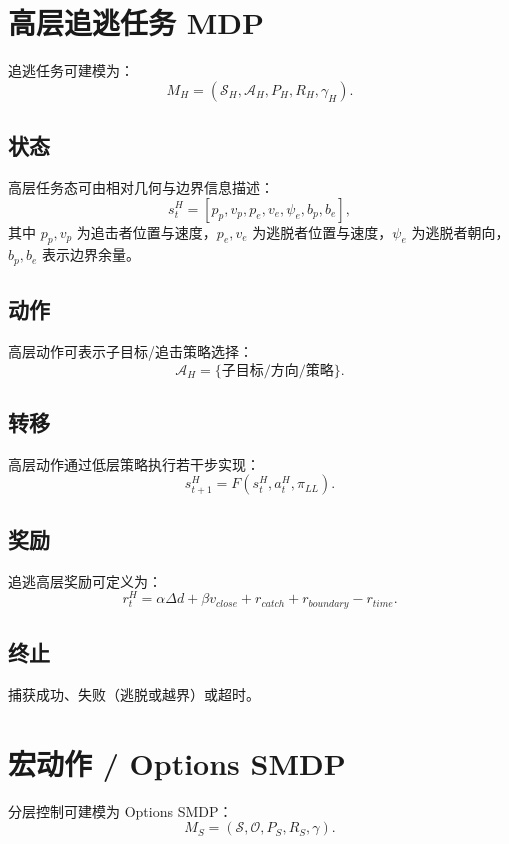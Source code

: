 \documentclass[11pt]{article}
\begin{document}
\section{高层追逃任务 MDP}
追逃任务可建模为：
\begin{equation}
M_H = (\mathcal{S}_H, \mathcal{A}_H, P_H, R_H, \gamma_H).
\end{equation}

\subsection*{状态}
高层任务态可由相对几何与边界信息描述：
\begin{equation}
 s_t^H = [p_p, v_p, p_e, v_e, \psi_e, b_p, b_e],
\end{equation}
其中 $p_p, v_p$ 为追击者位置与速度，$p_e, v_e$ 为逃脱者位置与速度，$\psi_e$ 为逃脱者朝向，$b_p, b_e$ 表示边界余量。

\subsection*{动作}
高层动作可表示子目标/追击策略选择：
\begin{equation}
 \mathcal{A}_H = \{\text{子目标/方向/策略}\}.
\end{equation}

\subsection*{转移}
高层动作通过低层策略执行若干步实现：
\begin{equation}
 s_{t+1}^{H} = F(s_t^{H}, a_t^{H}, \pi_{LL}).
\end{equation}

\subsection*{奖励}
追逃高层奖励可定义为：
\begin{equation}
 r_t^H = \alpha\Delta d + \beta v_{close} + r_{catch} + r_{boundary} - r_{time}.
\end{equation}

\subsection*{终止}
捕获成功、失败（逃脱或越界）或超时。

\section{宏动作 / Options SMDP}
分层控制可建模为 Options SMDP：
\begin{equation}
M_S = (\mathcal{S}, \mathcal{O}, P_S, R_S, \gamma).
\end{equation}
\end{document}
